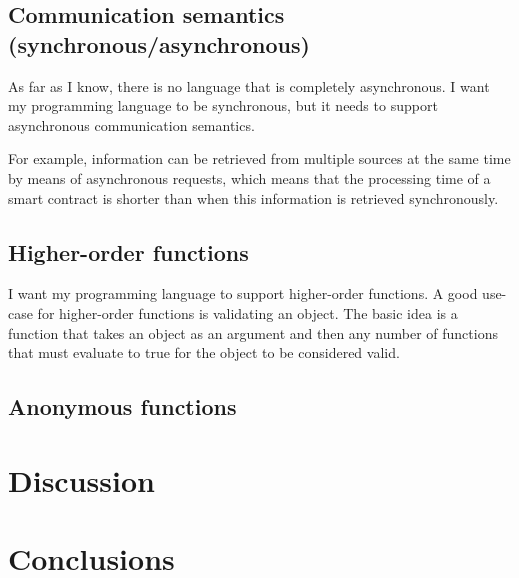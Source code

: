 \documentclass{uva-inf-article}
\begin{document}
\subsection{Communication semantics (synchronous/asynchronous)}
As far as I know, there is no language that is completely asynchronous. 
I want my programming language to be synchronous, but it needs to support asynchronous communication semantics.

For example, information can be retrieved from multiple sources at the same time by means of asynchronous requests, 
which means that the processing time of a smart contract is shorter than when this information is retrieved synchronously.

\subsection{Higher-order functions}
I want my programming language to support higher-order functions.
A good use-case for higher-order functions is validating an object.
The basic idea is a function that takes an object as an argument and then any number of 
functions that must evaluate to true for the object to be considered valid.



\subsection{Anonymous functions}

\section{Discussion}

\section{Conclusions}


\printbibliography


\end{document}
